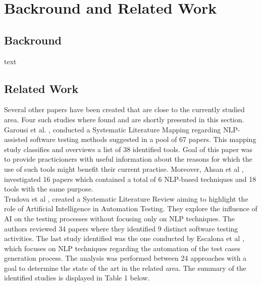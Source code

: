 \chapter*{Backround and Related Work}

\section*{Backround}
text

\section*{Related Work}

Several other papers have been created that are close to the currently studied area. Four such studies where found \cite{garousi2020nlp,battina2019artificial,ahsan2017comprehensive,escalona2011overview} 
and are shortly presented in this section. Garousi et al. \cite{garousi2020nlp}, conducted a Systematic Literature Mapping regarding NLP-assisted software testing methods suggested in a pool 
of 67 papers. This mapping study classifies and overviews a list of 38 identified tools. Goal of this paper was to provide practicioners with useful information about the reasons for which 
the use of such tools might benefit their current practise. Moreover, Ahsan et al \cite{ahsan2017comprehensive}, investigated 16 papers which contained a total of 6 NLP-based techniques and 
18 tools with the same purpose. \\

Trudova et al \cite{battina2019artificial}, created a Systematic Literature Review aiming to highlight the role of Artificial Intelligence in Automation Testing. 
They explore the influence of AI on the testing processes without focusing only on NLP techniques. The authors reviewed 34 papers where they identified 9 distinct software testing activities. 
The last study identified was the one conducted by Escalona et al \cite{escalona2011overview}, which focuses on NLP techniques regarding the automation of the test cases generation process. 
The analysis was performed between 24 approaches with a goal to determine the state of the art in the related area. The summary of the identified studies is displayed in Table 1 below.\\


